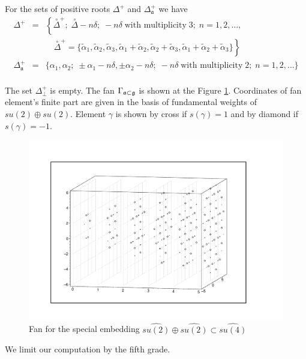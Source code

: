 \documentclass[a4paper,12pt]{article}
\theoremstyle{definition} \newtheorem{Def}{Definition}
\newcommand{\co}[1]{\overset{\circ }{#1}}
\begin{document}
For the sets of positive roots $\Delta^{+}$ and $\Delta_{\mathfrak{a}}^{+}$ we have
\begin{equation}
  \label{eq:38}
  \begin{array}{lll}
    \Delta^{+} &=&\left\{\co{\Delta}^{+};\; \co{\Delta}-n\delta;\;     -n\delta\;\mbox{with multiplicity}\; 3;\; n=1,2,\dots,\right. \\
    & & \quad\left.\co{\Delta}^{+}=\{\tilde{\alpha}_1, \tilde{\alpha}_2, \tilde{\alpha}_3, \tilde{\alpha}_1+\tilde{\alpha}_2, \tilde{\alpha}_2+\tilde{\alpha}_3, \tilde{\alpha}_1+\tilde{\alpha}_2+\tilde{\alpha}_3\}\right\}\\
    \Delta_{\mathfrak{a}}^{+} &=& \{  \alpha_1,\alpha_2;\;\pm \alpha_1-n\delta,\pm \alpha_2-n\delta;\; -n\delta\; \mbox{with multiplicity} \; 2;\; n=1,2,\dots\}\\
  \end{array}
\end{equation}

The set $\Delta^{+}_{\bot}$ is empty. 
The fan $\Gamma _{\frak{a}\subset \frak{g}}$ is shown at the Figure \ref{fig:A1+A1-A3_fan}. Coordinates of fan element's finite part are given in the basis of fundamental weights of $su(2)\oplus su(2)$. Element $\gamma$ is shown by cross if  $s(\gamma)=1$ and by diamond if $s(\gamma)=-1$.
\begin{figure}[h!tb]
  \includegraphics[width=150mm]{A1+A1-A3_fan.pdf}
  \caption{Fan for the special embedding $\widehat{su(2)}\oplus\widehat{su(2)}\subset \widehat{su(4)}$}
  \label{fig:A1+A1-A3_fan}
\end{figure}

We limit our computation by the fifth grade.
\end{document}
